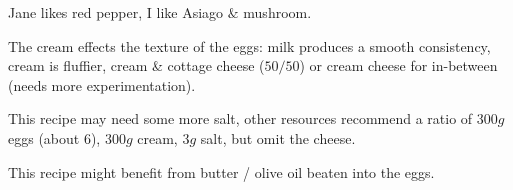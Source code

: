 \begin{variation}
	\item Jane likes red pepper, I like Asiago $\&$ mushroom.
	\item The cream effects the texture of the eggs: milk produces a smooth consistency, cream is fluffier, cream \& cottage cheese ($50/50$) or cream cheese for in-between (needs more experimentation).
\end{variation}

\begin{experiments}
\item This recipe may need some more salt, other resources recommend a ratio of $300g$ eggs (about 6), $300g$ cream, $3g$ salt, but omit the cheese.
\item This recipe might benefit from butter / olive oil beaten into the eggs.
\end{experiments}

\recipeend